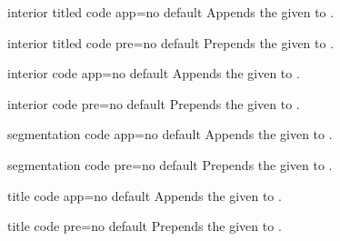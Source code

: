 \begin{docTcbKey}{interior titled code app}{=}{no default}
  Appends the given  to .
\begin{dispExample}
\begin{tcolorbox}[title=My title,enhanced,colframe=Navy,
  frame code app={\draw[yellow,line width=1cm] (
    frame.south west)--(frame.north east);},
  interior titled code app={\draw[red,line width=1cm]
    (frame.north west)--(frame.south east);},
  ]
\lipsum[1]
\end{tcolorbox}
\end{dispExample}
\end{docTcbKey}

\begin{docTcbKey}{interior titled code pre}{=}{no default}
  Prepends the given  to .
\end{docTcbKey}

\begin{docTcbKey}{interior code app}{=}{no default}
  Appends the given  to .
\end{docTcbKey}

\begin{docTcbKey}{interior code pre}{=}{no default}
  Prepends the given  to .
\end{docTcbKey}

\begin{docTcbKey}{segmentation code app}{=}{no default}
  Appends the given  to .
\end{docTcbKey}

\begin{docTcbKey}{segmentation code pre}{=}{no default}
  Prepends the given  to .
\end{docTcbKey}


\begin{docTcbKey}{title code app}{=}{no default}
  Appends the given  to .
\end{docTcbKey}

\begin{docTcbKey}{title code pre}{=}{no default}
  Prepends the given  to .
\end{docTcbKey}


